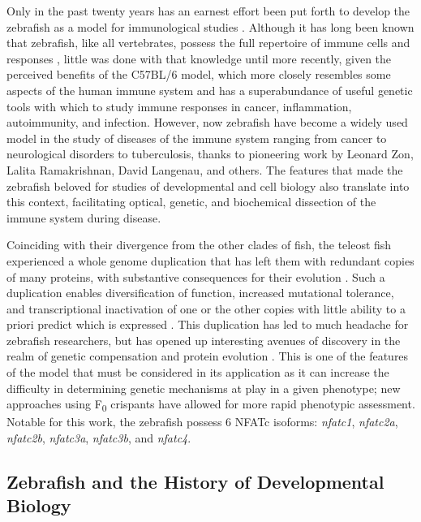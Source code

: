 Only in the past twenty years has an earnest effort been put forth to develop the zebrafish as a model for immunological studies \citep{Hsu2004, Davis2002, Langenau2003}. Although it has long been known that zebrafish, like all vertebrates, possess the full repertoire of immune cells and responses \citep{LugoVillarino2010, Liongue2009}, little was done with that knowledge until more recently, given the perceived benefits of the C57BL/6 model, which more closely resembles some aspects of the human immune system and has a superabundance of useful genetic tools with which to study immune responses in cancer, inflammation, autoimmunity, and infection. However, now zebrafish have become a widely used model in the study of diseases of the immune system ranging from cancer to neurological disorders to tuberculosis, thanks to pioneering work by Leonard Zon, Lalita Ramakrishnan, David Langenau, and others. The features that made the zebrafish beloved for studies of developmental and cell biology also translate into this context, facilitating optical, genetic, and biochemical dissection of the immune system during disease.

Coinciding with their divergence from the other clades of fish, the teleost fish experienced a whole genome duplication that has left them with redundant copies of many proteins, with substantive consequences for their evolution \citep{Amores2011, Glasauer2014, Howe2013, Meyer1999}. Such a duplication enables diversification of function, increased mutational tolerance, and transcriptional inactivation of one or the other copies with little ability to a priori predict which is expressed \citep{Opazo2013, Voldoire2017}. This duplication has led to much headache for zebrafish researchers, but has opened up interesting avenues of discovery in the realm of genetic compensation and protein evolution \citep{Rossi2015, ElBrolosy2017, ElBrolosy2019, Sztal2020, Stainier2015, Moleri2011, Boudinot2011, Stainier2017, Kontarakis2020}. This is one of the features of the model that must be considered in its application as it can increase the difficulty in determining genetic mechanisms at play in a given phenotype; new approaches using F\textsubscript{0} crispants have allowed for more rapid phenotypic assessment. Notable for this work, the zebrafish possess 6 NFATc isoforms: \textit{nfatc1}, \textit{nfatc2a}, \textit{nfatc2b}, \textit{nfatc3a}, \textit{nfatc3b}, and \textit{nfatc4}.

\subsection{Zebrafish and the History of Developmental Biology}

